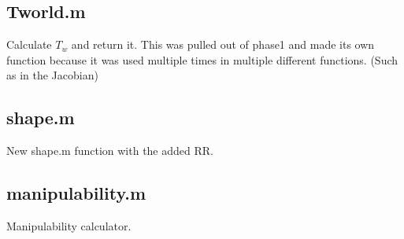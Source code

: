 \documentclass{report}
\begin{document}
\begin{spacing}{1.1}
\begin{appendices}
\subsection{Tworld.m}
Calculate $T_w$ and return it. This was pulled out of phase1 and made its own function because it was used multiple times in multiple different functions. (Such as in the Jacobian)


\subsection{shape.m}
New shape.m function with the added RR.


\subsection{manipulability.m}
Manipulability calculator.


\end{appendices}

\end{spacing}
\end{document}
